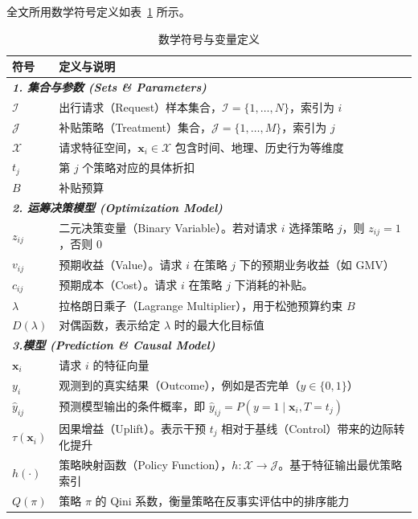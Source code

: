 全文所用数学符号定义如表~\ref{tab:nomenclature} 所示。
\begin{table}[htbp]
    \centering
    \caption{数学符号与变量定义}
    \label{tab:nomenclature}
    \renewcommand{\arraystretch}{1.3} %
    \begin{tabular}{p{2.0cm} p{12.5cm}}
        \toprule
        \textbf{符号} & \textbf{定义与说明} \\
        \midrule
        \multicolumn{2}{l}{\textit{\textbf{1. 集合与参数 (Sets \& Parameters)}}} \\
        \midrule
        $\mathcal{I}$ & 出行请求（Request）样本集合，$\mathcal{I} = \{1, \dots, N\}$，索引为 $i$ \\
        $\mathcal{J}$ & 补贴策略（Treatment）集合，$\mathcal{J} = \{1, \dots, M\}$，索引为 $j$ \\
        $\mathcal{X}$ & 请求特征空间，$\bm{x}_i \in \mathcal{X}$ 包含时间、地理、历史行为等维度 \\
        $t_j$         & 第 $j$ 个策略对应的具体折扣 \\
        $B$           & 补贴预算 \\
        \midrule
        \multicolumn{2}{l}{\textit{\textbf{2. 运筹决策模型 (Optimization Model)}}} \\
        \midrule
        $z_{ij}$      & 二元决策变量（Binary Variable）。若对请求 $i$ 选择策略 $j$，则 $z_{ij}=1$，否则 $0$ \\
        $v_{ij}$      & 预期收益（Value）。请求 $i$ 在策略 $j$ 下的预期业务收益（如 GMV） \\
        $c_{ij}$      & 预期成本（Cost）。请求 $i$ 在策略 $j$ 下消耗的补贴。 \\
        $\lambda$     & 拉格朗日乘子（Lagrange Multiplier），用于松弛预算约束 $B$ \\
        $D(\lambda)$  & 对偶函数，表示给定 $\lambda$ 时的最大化目标值 \\
        \midrule
        \multicolumn{2}{l}{\textit{\textbf{3.模型 (Prediction \& Causal Model)}}} \\
        \midrule
        $\bm{x}_i$    & 请求 $i$ 的特征向量 \\
        $y_i$         & 观测到的真实结果（Outcome），例如是否完单（$y \in \{0,1\}$） \\
        $\hat{y}_{ij}$ & 预测模型输出的条件概率，即 $\hat{y}_{ij} = P(y=1 \mid \bm{x}_i, T=t_j)$ \\
        $\tau(\bm{x}_i)$ & 因果增益（Uplift）。表示干预 $t_j$ 相对于基线（Control）带来的边际转化提升 \\
        $h(\cdot)$    & 策略映射函数（Policy Function），$h: \mathcal{X} \rightarrow \mathcal{J}$。基于特征输出最优策略索引 \\
        $Q(\pi)$      & 策略 $\pi$ 的 Qini 系数，衡量策略在反事实评估中的排序能力 \\
        \bottomrule
    \end{tabular}
\end{table}